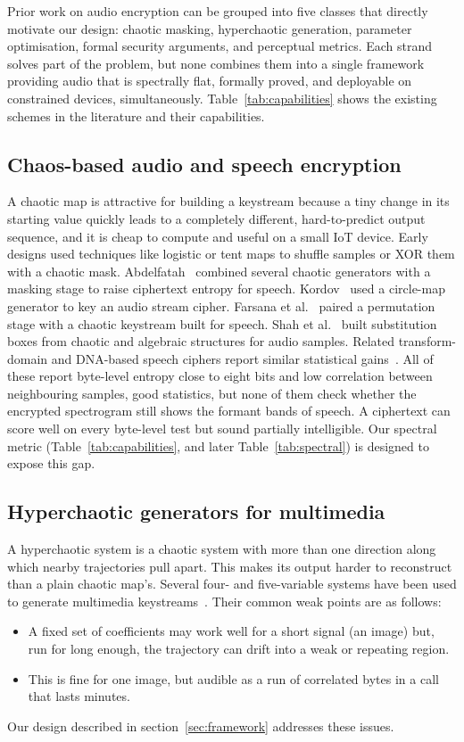 \documentclass[pdflatex,sn-mathphys-num]{sn-jnl}%
\theoremstyle{thmstyleone}%
\theoremstyle{thmstyletwo}%
\theoremstyle{thmstylethree}%
\begin{document}
Prior work on audio encryption can be grouped into five classes that directly motivate our design: chaotic masking, hyperchaotic generation, parameter optimisation, formal security arguments, and perceptual metrics. Each strand solves part of the problem, but none combines them into a single framework providing audio that is spectrally flat, formally proved, and deployable on constrained devices, simultaneously. Table~\ref{tab:capabilities} shows the existing schemes in the literature and their capabilities.

\subsection{Chaos-based audio and speech encryption}
A chaotic map is attractive for building a keystream because a tiny change in
its starting value quickly leads to a completely different, hard-to-predict
output sequence, and it is cheap to compute and useful on a small IoT device.
Early designs used techniques like logistic or tent maps to shuffle samples or XOR them with a chaotic mask. Abdelfatah~\cite{abdelfatah2020} combined several
chaotic generators with a masking stage to raise ciphertext entropy for
speech. Kordov~\cite{kordov2021} used a circle-map generator to key an
audio stream cipher. Farsana et al.~\cite{farsana2021} paired a permutation
stage with a chaotic keystream built for speech. Shah et al.~\cite{shah2021} built substitution boxes from chaotic and algebraic structures
for audio samples. Related transform-domain and DNA-based speech ciphers
report similar statistical gains~\cite{peng2020,sathiyamurthi2020,lima2015,elkamchouchi2020,naskar2019}. All of these report byte-level entropy close to
eight bits and low correlation between neighbouring samples, good statistics,
but none of them check whether the encrypted spectrogram still shows the
formant bands of speech. A ciphertext can score well on every byte-level test
but sound partially intelligible. Our spectral
metric (Table~\ref{tab:capabilities}, and later Table~\ref{tab:spectral})
is designed to expose this gap.

\subsection{Hyperchaotic generators for multimedia}
A hyperchaotic system is a chaotic system with more than one direction
along which nearby trajectories pull apart. This makes its output harder to
reconstruct than a plain chaotic map's. Several
four- and five-variable systems have been used to generate multimedia
keystreams~\cite{lin2021,zhou2020,pak2017}. Their common weak points are as follows:
\begin{itemize}
    \item A fixed set of coefficients may work well for a short signal (an image) but, run for long enough, the trajectory can drift into a weak or repeating region.
    \item This is fine for one image, but audible as a run of correlated bytes in a call that lasts minutes.
\end{itemize}
Our design described in section~\ref{sec:framework} addresses these issues.
\end{document}
